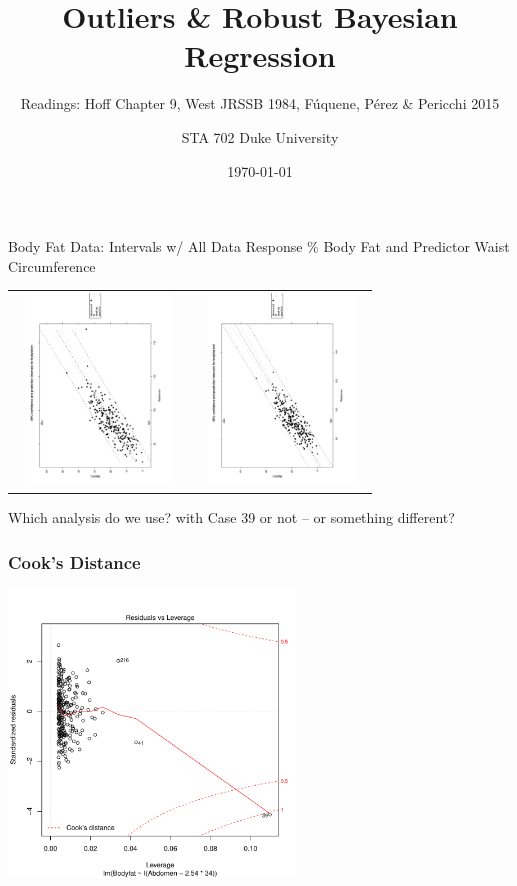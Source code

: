 \documentclass[]{beamer}
\title{Outliers \& Robust Bayesian  Regression}
\author{STA 702 Duke University}
\subtitle{Readings: Hoff Chapter 9, West JRSSB 1984, F{\'{u}}quene,
    P{\'e}rez \& Pericchi 2015}
\institute{Duke University}
\date{\today}
\begin{document}

\maketitle

\begin{frame}{Body Fat Data: Intervals w/ All Data}
Response \% Body Fat and Predictor Waist Circumference

  \begin{tabular}{cc}
{\includegraphics[height=2in,width=1.75in,angle=270]{pred}} &
{\includegraphics[height=2in,width=1.75in,angle=270]{pred-sub}}
  \end{tabular}

  Which analysis do we use?  with Case 39 or not -- or something different?


\end{frame}  \begin{frame} \frametitle{Cook's Distance}

{\includegraphics[height=3in]{CooksD}}

\end{frame}
\end{document}
